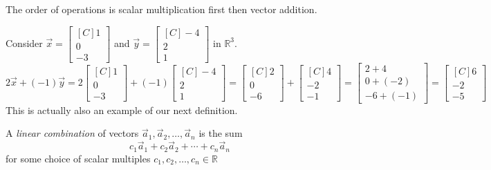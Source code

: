The order of operations is scalar multiplication first then vector addition.

\begin{example}
Consider $\vec{x}=\begin{bmatrix*}[C]1\\ 0 \\ -3\end{bmatrix*}$ and
$\vec{y}=\begin{bmatrix*}[C]-4\\ 2 \\ 1\end{bmatrix*}$ in $\mathbb{R}^3$.
\[
2\vec{x}+(-1)\vec{y}=
2\begin{bmatrix*}[C]1\\ 0 \\ -3\end{bmatrix*}+
(-1)\begin{bmatrix*}[C]-4\\ 2 \\ 1\end{bmatrix*}=
\begin{bmatrix*}[C]2\\ 0 \\ -6\end{bmatrix*}+
\begin{bmatrix*}[C]4\\ -2 \\ -1\end{bmatrix*}=
\begin{bmatrix}2+4\\ 0+(-2) \\ -6+(-1)\end{bmatrix}=
\begin{bmatrix*}[C]6\\ -2 \\ -5\end{bmatrix*}
\]
This is actually also an example of our next definition.
\end{example}

\begin{definition}
A \emph{linear combination} of vectors $\vec{a}_1, \vec{a}_2, \ldots,
\vec{a}_n$ is the sum
\[c_1\vec{a}_1+c_2\vec{a}_2+\cdots+c_n\vec{a}_n\]
for some choice of scalar multiples $c_1,c_2, \ldots, c_n \in \mathbb{R}$
\end{definition}


